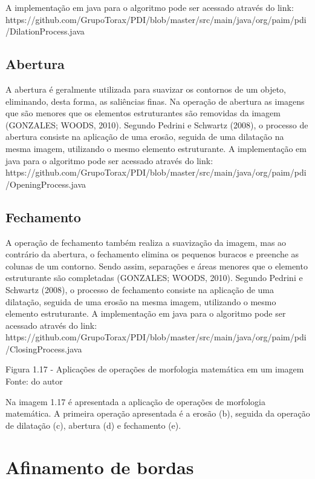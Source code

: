 \documentclass[
	12pt,				%
	oneside,			%
	a4paper,			%
	english,			%
	french,				%
	spanish,			%
	brazil,				%
	]{abntex2}
\begin{document}
A implementação em java para o algoritmo pode ser acessado através do link:
https://github.com/GrupoTorax/PDI/blob/master/src/main/java/org/paim/pdi/DilationProcess.java 

\subsection{Abertura}

A abertura é geralmente utilizada para suavizar os contornos de um objeto, eliminando, desta forma, as saliências finas. Na operação de abertura as imagens que são menores que os elementos estruturantes são removidas da imagem (GONZALES; WOODS, 2010).
Segundo Pedrini e Schwartz (2008), o processo de abertura consiste na aplicação de uma erosão, seguida de uma dilatação na mesma imagem, utilizando o mesmo elemento estruturante.
 A implementação em java para o algoritmo pode ser acessado através do link:
https://github.com/GrupoTorax/PDI/blob/master/src/main/java/org/paim/pdi/OpeningProcess.java 

\subsection{Fechamento}

A operação de fechamento também realiza a suavização da imagem, mas ao contrário da abertura, o fechamento elimina os pequenos buracos e preenche as colunas de um contorno. Sendo assim, separações e áreas menores que o elemento estruturante são completadas (GONZALES; WOODS, 2010).
Segundo Pedrini e Schwartz (2008), o processo de fechamento consiste na aplicação de uma dilatação, seguida de uma erosão na mesma imagem, utilizando o mesmo elemento estruturante.
 A implementação em java para o algoritmo pode ser acessado através do link:
https://github.com/GrupoTorax/PDI/blob/master/src/main/java/org/paim/pdi/ClosingProcess.java 

Figura 1.17 - Aplicações de operações de morfologia matemática em um imagem 
Fonte: do autor

Na imagem 1.17 é apresentada a aplicação de operações de morfologia matemática. A primeira operação apresentada é a erosão (b), seguida da operação de dilatação (c), abertura (d) e fechamento (e).
    
\section{Afinamento de bordas}    
\end{document}

